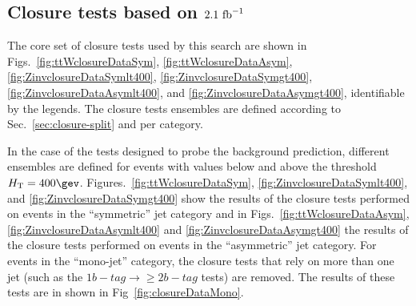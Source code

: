 
\subsection{Closure tests based on $2.1~\ifb$}
\label{sec:closure-data-study}

The core set of closure tests used by this search are shown in
Figs.~\ref{fig:ttWclosureDataSym}, \ref{fig:ttWclosureDataAsym},
\ref{fig:ZinvclosureDataSymlt400}, \ref{fig:ZinvclosureDataSymgt400},
\ref{fig:ZinvclosureDataAsymlt400}, and
\ref{fig:ZinvclosureDataAsymgt400}, identifiable by the legends. The
closure tests ensembles are defined according to
Sec.~\ref{sec:closure-split} and per \njet category. 

In the case of the tests designed to probe the \znunu background
prediction, different ensembles are defined for events with values
below and above the threshold $\scalht=400\gev$. 
Figures.~\ref{fig:ttWclosureDataSym},
\ref{fig:ZinvclosureDataSymlt400}, and
\ref{fig:ZinvclosureDataSymgt400} show the results of the closure
tests performed on events in the ``symmetric'' jet category and in
Figs.~\ref{fig:ttWclosureDataAsym}, \ref{fig:ZinvclosureDataAsymlt400}
and \ref{fig:ZinvclosureDataAsymgt400} the results of the closure
tests performed on events in the ``asymmetric'' jet category. For
events in the ``mono-jet'' category, the closure tests that rely on
more than one jet (such as the $1 b-tag\rightarrow\geq 2 b-tag$ tests)
are removed. The results of these tests are in shown in
Fig~\ref{fig:closureDataMono}.

